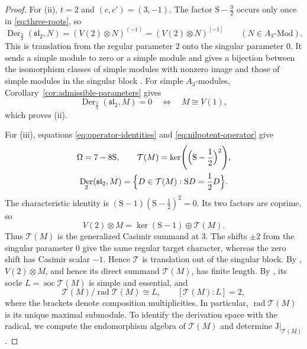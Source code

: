 \documentclass[11pt,reqno]{amsart}
\numberwithin{equation}{section}
\newcommand{\s}{\mathfrak{sl}_2}
\newcommand{\T}{\mathcal T}
\DeclareMathOperator{\Der}{Der}
\DeclareMathOperator{\soc}{soc}
\DeclareMathOperator{\rad}{rad}
\theoremstyle{definition}
\theoremstyle{remark}
\begin{document}
\begin{proof}
For (ii), \(t=2\) and \((c,c')=(3,-1)\). The factor
\(\mathrm{S}-\frac{3}{2}\) occurs only once in
\eqref{eq:three-roots}, so
\[
\Der_{\frac{2}{3}}(\s,N)
=(V(2)\otimes N)^{(-1)}=(V(2)\otimes N)^{[-1]}
\qquad(N\in A_3\text{-}\mathrm{Mod}).
\]
This is translation from the regular parameter \(2\) onto the
singular parameter \(0\). It sends a simple module to zero or
a simple module and gives a bijection between the isomorphism
classes of simple modules with nonzero image and those of simple
modules in the singular block
\cite[Theorem~26]{CCM21}. For simple \(A_3\)-modules,
Corollary~\ref{cor:admissible-parameters} gives
\[
\Der_{\frac{2}{3}}(\s,M)=0\quad\Longleftrightarrow\quad
M\cong V(1),
\]
which proves (ii).

For (iii), equations \eqref{eq:operator-identities} and
\eqref{eq:nilpotent-operator} give
\begin{equation}\label{eq:out-operators}
\begin{gathered}
\Omega=7-8\mathrm{S},\qquad
\T(M)=\ker\Biggl(\Bigl(\mathrm{S}-\frac{1}{2}\Bigr)^2\Biggr),\\
\Der_2(\s,M)=\Bigl\{D\in\T(M):\mathrm{S}D=\frac{1}{2}D\Bigr\}.
\end{gathered}
\end{equation}
The characteristic identity is
\((\mathrm{S}-1)(\mathrm{S}-\frac{1}{2})^2=0\).
Its two factors are coprime, so
\[
V(2)\otimes M=\ker(\mathrm{S}-1)\oplus\T(M).
\]
Thus \(\T(M)\) is the generalized Casimir summand at \(3\).
The shifts \(\pm2\) from the singular parameter \(0\) give
the same regular target character, whereas the zero shift has
Casimir scalar \(-1\). Hence \(\T\) is translation out of the
singular block.
By \cite[Theorem~33]{CCM21}, \(V(2)\otimes M\), and hence
its direct summand \(\T(M)\), has finite length.
By \cite[Theorem~26(i)--(iii)]{CCM21}, its socle \(L=\soc\T(M)\) is simple and
essential, and
\[
\T(M)/\rad\T(M)\cong L,\qquad [\T(M):L]=2,
\]
where the brackets denote composition multiplicities.
In particular, \(\rad\T(M)\) is its unique maximal submodule.
To identify the derivation space with the radical, we compute
the endomorphism algebra of \(\T(M)\) and determine
\(\mathrm J|_{\T(M)}\).


\end{proof}
\end{document}
